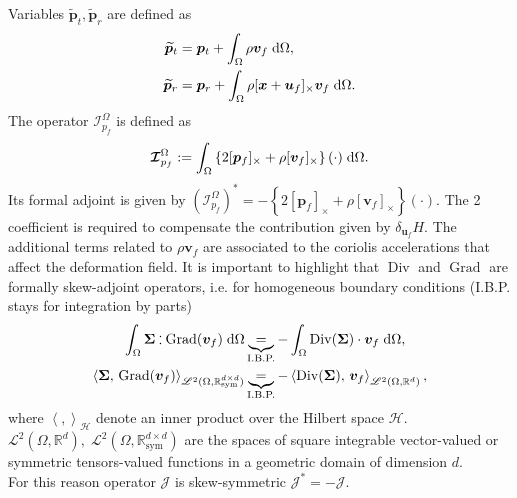 \documentclass{svjour3}                     %
\DeclareMathOperator*{\Grad}{Grad}
\DeclareMathOperator*{\Div}{Div}
\newcommand{\crmat}[1]{\ensuremath{[#1]_{\times}}}
\def\onedot{$\mathsurround0pt\ldotp$}
\def\cddot{%
	\mathbin{\vcenter{\baselineskip.67ex
			\hbox{\onedot}\hbox{\onedot}}%
}}
\begin{document}
Variables $\widetilde{\bm{p}}_t, \widetilde{\bm{p}}_r$ are defined as
\begin{equation}
\label{eq:mod_momenta}
\begin{aligned}
\widetilde{\bm{p}}_t &= \bm{p}_t + \int_{\Omega} \rho \bm{v}_f \d{\Omega}, \\
\widetilde{\bm{p}}_r &= \bm{p}_r + \int_{\Omega} \rho \crmat{\bm{x} + \bm{u}_f}\bm{v}_f \d{\Omega}. \\
\end{aligned}
\end{equation}
The operator $\bm{\mathcal{I}}_{p_f}^\Omega$ is defined as 
\begin{equation*}
\bm{\mathcal{I}}_{p_f}^\Omega := \int_\Omega \left\{2 \crmat{\bm{p}_f} + \rho \crmat{\bm{v}_f} \right\}(\cdot) \d{\Omega}.
\end{equation*}
Its  formal adjoint is given by $(\bm{\mathcal{I}}_{p_f}^\Omega)^* = - \left\{2 \crmat{\bm{p}_f} + \rho \crmat{\bm{v}_f} \right\}(\cdot)$. The 2 coefficient is required to compensate the contribution given by $\delta_{\bm{u}_f} H$. The additional terms related to $\rho \bm{v}_f$ are associated to the coriolis accelerations that affect the deformation field. It is important to highlight that $\Div$ and $\Grad$ are formally skew-adjoint operators, i.e. for homogeneous boundary conditions (I.B.P. stays for integration by parts)
\begin{align*}
\int_{\Omega} \bm\Sigma \cddot \Grad(\bm{v}_f) \d{\Omega} &\underbrace{=}_{\text{I.B.P.}} -\int_{\Omega} \Div(\bm\Sigma) \cdot \bm{v}_f \d{\Omega}, \\
\left\langle \bm\Sigma, \, \Grad(\bm{v}_f) \right\rangle_{\mathscr{L}^2(\Omega, \mathbb{R}^{d\times d}_{\text{sym}})} &\underbrace{=}_{\text{I.B.P.}} -\left\langle\Div(\bm\Sigma), \, \bm{v}_f \right\rangle_{\mathscr{L}^2(\Omega, \mathbb{R}^d)}, 
\end{align*}
where $\left\langle ,  \right\rangle_\mathscr{H}$ denote an inner product over the Hilbert space $\mathscr{H}$. \\
$\mathscr{L}^2(\Omega, \mathbb{R}^d), \; \mathscr{L}^2(\Omega, \mathbb{R}^{d\times d}_{\text{sym}})$ are the spaces of square integrable vector-valued or symmetric tensors-valued functions in a geometric domain of dimension $d$. \\
For this reason operator $\bm{\mathcal{J}}$ is skew-symmetric $\bm{\mathcal{J}}_{}^* = - \bm{\mathcal{J}}$.
\end{document}
